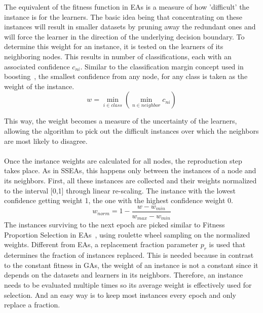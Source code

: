 \documentclass{llncs}
\begin{document}
The equivalent of the fitness function in EAs is a measure of how 'difficult' the instance is for the learners. The basic idea being that concentrating on these instances will result in smaller datasets by pruning away the redundant ones and will force the learner in the direction of the underlying decision boundary. To determine this weight for an instance, it is tested on the learners of its neighboring nodes. This results in number of classifications, each with an associated confidence $c_{ni}$. Similar to the classification margin concept used in boosting~\cite{Schapire97boosting}, the smallest confidence from any node, for any class is taken as the weight of the instance.
$$
w = \min_{i \in class}(\min_{n \in neighbor} c_{ni})
$$

This way, the weight becomes a measure of the uncertainty of the learners, allowing the algorithm to pick out the difficult instances over which the neighbors are most likely to disagree. 
\paragraph{}
Once the instance weights are calculated for all nodes, the reproduction step takes place. As in SSEAs, this happens only between the instances of a node and its neighbors. First, all these instances are collected and their weights normalized to the interval [0,1] through linear re-scaling. The instance with the lowest confidence getting weight 1, the one with the highest confidence weight 0.
$$
 w_{norm} = 1- \frac{w-w_{min}}{w_{max}-w_{min}}
$$
The instances surviving to the next epoch are picked similar to Fitness Proportion Selection in EAs~\cite{dejong01}, using roulette wheel sampling on the normalized weights.   Different from EAs, a replacement fraction parameter $p_{r}$ is used that determines the fraction of instances replaced. This is needed because in contrast to the constant fitness in GAs, the weight of an instance is not a constant since it depends on the datasets and learners in its neighbors.  Therefore, an instance needs to be evaluated multiple times so its average weight is effectively used for selection. And an easy way is to keep most instances every epoch and only replace a fraction.
\end{document}
